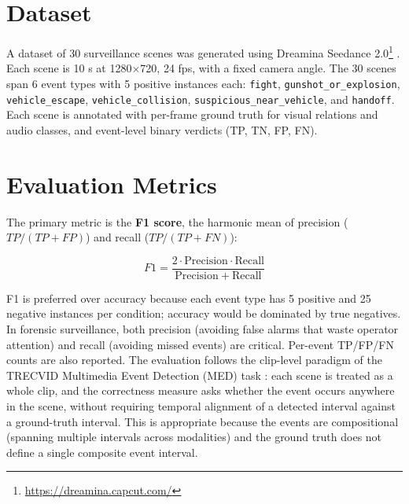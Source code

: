\section{Dataset}
\label{sec:dataset}

A dataset of 30 surveillance scenes was generated using Dreamina Seedance 2.0\footnote{\url{https://dreamina.capcut.com/}} \citep{seedance2026}. Each scene is 10 s at 1280$\times$720, 24 fps, with a fixed camera angle. The 30 scenes span 6 event types with 5 positive instances each: \texttt{fight}, \texttt{gunshot\_or\_explosion}, \texttt{vehicle\_escape}, \texttt{vehicle\_collision}, \texttt{suspicious\_near\_vehicle}, and \texttt{handoff}. Each scene is annotated with per-frame ground truth for visual relations and audio classes, and event-level binary verdicts (TP, TN, FP, FN).

\section{Evaluation Metrics}
\label{sec:metrics}

The primary metric is the \textbf{F1 score}, the harmonic mean of precision ($\mathit{TP}/(\mathit{TP}+\mathit{FP})$) and recall ($\mathit{TP}/(\mathit{TP}+\mathit{FN})$):

\[
F1 = \frac{2 \cdot \mathrm{Precision} \cdot \mathrm{Recall}}{\mathrm{Precision} + \mathrm{Recall}}
\]

F1 is preferred over accuracy because each event type has 5 positive and 25 negative instances per condition; accuracy would be dominated by true negatives. In forensic surveillance, both precision (avoiding false alarms that waste operator attention) and recall (avoiding missed events) are critical. Per-event TP/FP/FN counts are also reported. The evaluation follows the clip-level paradigm of the TRECVID Multimedia Event Detection (MED) task \citep{over2014trecvid}: each scene is treated as a whole clip, and the correctness measure asks whether the event occurs anywhere in the scene, without requiring temporal alignment of a detected interval against a ground-truth interval. This is appropriate because the events are compositional (spanning multiple intervals across modalities) and the ground truth does not define a single composite event interval.

